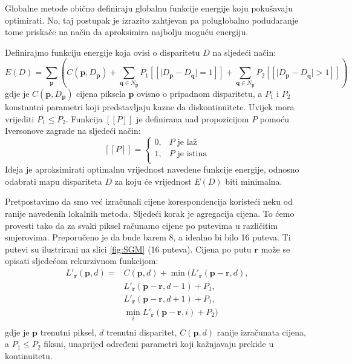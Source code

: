 \documentclass[utf8, zavrsni, numeric]{fer}
\begin{document}
Globalne metode obično definiraju globalnu funkcije energije koju pokušavaju optimirati.
No, taj postupak je izrazito zahtjevan pa poluglobalno podudaranje tome priskače na način
da aproksimira najbolju moguću energiju.

Definirajmo funkciju energije koja ovisi o disparitetu $D$ na sljedeći način:
\begin{equation} \label{energija}
E(D) = \sum_{\mathbf{p}}(C(\mathbf{p}, D_{\mathbf{p}}) + \sum_{\mathbf{q} \in N_{\mathbf{p}}} P_1 [\![\lvert D_{\mathbf{p}} - D_{\mathbf{q}}\rvert = 1]\!] + \sum_{\mathbf{q} \in N_{\mathbf{p}}} P_2 [\![\lvert D_{\mathbf{p}} - D_{\mathbf{q}}\rvert > 1]\!])
\end{equation}
gdje je $C(\mathbf{p}, D_{\mathbf{p}})$ cijena piksela $\mathbf{p}$ ovisno o pripadnom disparitetu, a $P_1$ i $P_2$ konstantni parametri koji predstavljaju kazne da diskontinuitete. Uvijek mora vrijediti $P_1 \leq P_2$.
Funkcija $[\![P]\!]$ je definirana nad propozicijom $P$ pomoću Iversonove zagrade na sljedeći način:
\[   
[\![P]\!] = 
     \begin{cases}
       0, & P \text{ je laž} \\
       1, & P \text{ je istina} \\
     \end{cases}
\]
Ideja je aproksimirati optimalnu vrijednost navedene funkcije energije, odnosno odabrati
mapu dispariteta $D$ za koju će vrijednost $E(D)$ biti minimalna.

Pretpostavimo da smo već izračunali cijene korespondencija koristeći neku od ranije navedenih lokalnih metoda.
Sljedeći korak je agregacija cijena. To ćemo provesti tako da za svaki piksel računamo cijene
po putevima u različitim smjerovima. Preporučeno je da bude barem 8, a idealno bi bilo 16 puteva. Ti putevi su ilustrirani na slici \ref{fig:SGM} (16 puteva). Cijena po putu $\mathbf{r}$
može se opisati sljedećom rekurzivnom funkcijom:
\begin{equation} \label{cijena_1}
  \begin{split}
    L'_{\mathbf{r}}(\mathbf{p}, d) = & C(\mathbf{p}, d) + \min(L'_{\mathbf{r}}(\mathbf{p} - \mathbf{r}, d), \\
    & L'_{\mathbf{r}}(\mathbf{p} - \mathbf{r}, d - 1) + P_1, \\
    & L'_{\mathbf{r}}(\mathbf{p} - \mathbf{r}, d + 1) + P_1, \\
    & \min\limits_{i} L'_{\mathbf{r}}(\mathbf{p} - \mathbf{r}, i) + P_2) \\
  \end{split}
\end{equation}
gdje je $\mathbf{p}$ trenutni piksel, $d$ trenutni disparitet, $C(\mathbf{p}, d)$ ranije
izračunata cijena, a $P_1 \leq P_2$ fiksni, unaprijed određeni parametri koji kažnjavaju
prekide u kontinuitetu.
\end{document}
